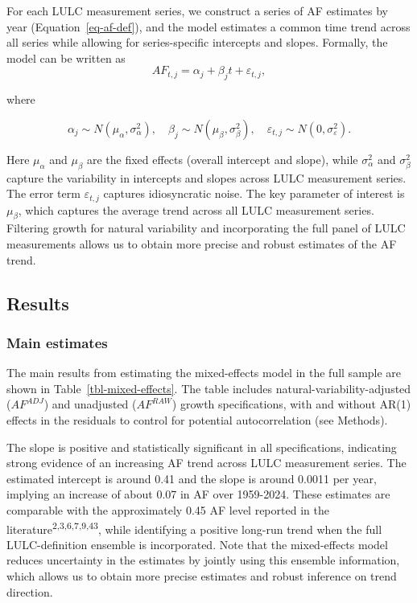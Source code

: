\documentclass[
  12pt,
  letterpaper,
  DIV=11,
  numbers=noendperiod]{scrartcl}
\begin{document}
For each LULC measurement series, we construct a series of AF estimates
by year (Equation~\ref{eq-af-def}), and the model estimates a common
time trend across all series while allowing for series-specific
intercepts and slopes. Formally, the model can be written as \[
AF_{t,j} = \alpha_j + \beta_j t +\varepsilon_{t,j},
\]

where

\[
\alpha_j \sim N(\mu_\alpha, \sigma_\alpha^2),\quad
\beta_j \sim N(\mu_\beta, \sigma_\beta^2),\quad
\varepsilon_{t,j} \sim N(0, \sigma_\varepsilon^2).
\]

Here \(\mu_\alpha\) and \(\mu_\beta\) are the fixed effects (overall
intercept and slope), while \(\sigma_\alpha^2\) and \(\sigma_\beta^2\)
capture the variability in intercepts and slopes across LULC measurement
series. The error term \(\varepsilon_{t,j}\) captures idiosyncratic
noise. The key parameter of interest is \(\mu_\beta\), which captures
the average trend across all LULC measurement series. Filtering growth
for natural variability and incorporating the full panel of LULC
measurements allows us to obtain more precise and robust estimates of
the AF trend.

\subsection*{Results}\label{results}

\subsubsection*{Main estimates}\label{main-estimates}

The main results from estimating the mixed-effects model in the full
sample are shown in Table~\ref{tbl-mixed-effects}. The table includes
natural-variability-adjusted (\(AF^{ADJ}\)) and unadjusted
(\(AF^{RAW}\)) growth specifications, with and without AR(1) effects in
the residuals to control for potential autocorrelation (see Methods).

The slope is positive and statistically significant in all
specifications, indicating strong evidence of an increasing AF trend
across LULC measurement series. The estimated intercept is around 0.41
and the slope is around 0.0011 per year, implying an increase of about
0.07 in AF over 1959-2024. These estimates are comparable with the
approximately 0.45 AF level reported in the
literature\textsuperscript{2,3,6,7,9,43}, while identifying a positive
long-run trend when the full LULC-definition ensemble is incorporated.
Note that the mixed-effects model reduces uncertainty in the estimates
by jointly using this ensemble information, which allows us to obtain
more precise estimates and robust inference on trend direction.
\end{document}
